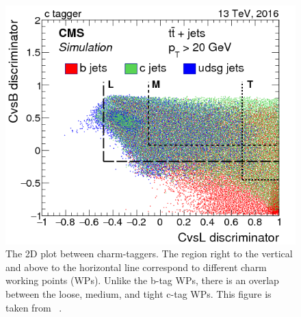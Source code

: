 \begin{figure}
\centering
\includegraphics[width=0.6\linewidth]{Image/cTagger.png}
\caption{The 2D plot between charm-taggers. The region right to the vertical 
    and above to the horizontal line correspond to different charm working 
    points (WPs). Unlike the b-tag WPs, there is an overlap between the loose,
    medium, and tight c-tag WPs. This figure is taken from
~\cite{CMS-PAS-BTV-16-001}.}
\label{fig:cTagger}
\end{figure}

